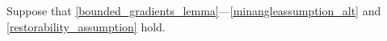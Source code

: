 Suppose that \cref{bounded_gradients_lemma}---\cref{minangleassumption_alt} and \cref{restorability_assumption} hold.
